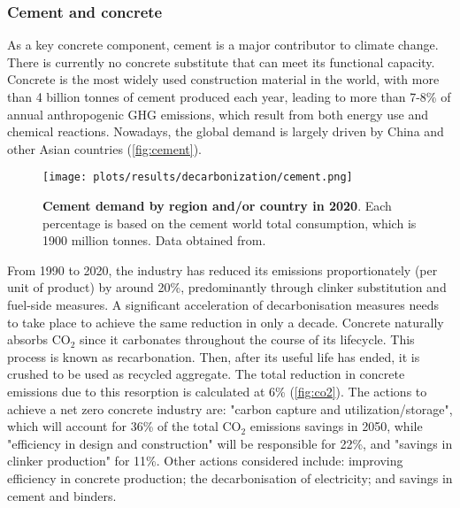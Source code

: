 \begin{enumerate}
\end{enumerate}


\subsubsection{Cement and concrete}
\label{sec:cement_and_concrete}

As a key concrete component, cement is a major contributor to climate change. There is currently no concrete substitute that can meet its functional capacity. Concrete is the most widely used construction material in the world, with more than 4 billion tonnes of cement produced each year, leading to more than 7-8\% of annual anthropogenic GHG emissions, which result from both energy use and chemical reactions.\autocite{cement2021concrete} Nowadays, the global demand is largely driven by China and other Asian countries\autocite{iea_2020} (\autoref{fig:cement}).

\begin{figure}[ht!]
  \centering
  \texttt{[image: plots/results/decarbonization/cement.png]}
  \caption[Cement demand by region and/or country in 2020]{\textbf{Cement demand by region and/or country in 2020}. Each percentage is based on the cement world total consumption, which is 1900 million tonnes. Data obtained from.\autocite{iea_2020}}
  \label{fig:cement}
\end{figure}

From 1990 to 2020, the industry has reduced its emissions proportionately (per unit of product) by around 20\%, predominantly through clinker substitution and fuel-side measures. A significant acceleration of decarbonisation measures needs to take place to achieve the same reduction in only a decade.\autocite{cement2021concrete} Concrete naturally absorbs CO$_2$ since it carbonates throughout the course of its lifecycle. This process is known as recarbonation. Then, after its useful life has ended, it is crushed to be used as recycled aggregate. The total reduction in concrete emissions due to this resorption is calculated at 6\%\autocite{aus_2022} (\autoref{fig:co2}). The actions to achieve a net zero concrete industry are: "carbon capture and utilization/storage", which will account for 36\% of the total CO$_2$ emissions savings in 2050, while "efficiency in design and construction" will be responsible for 22\%, and "savings in clinker production" for 11\%. Other actions considered include: improving efficiency in concrete production; the decarbonisation of electricity; and savings in cement and binders.

